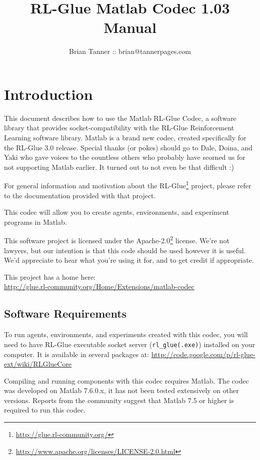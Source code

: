 \documentclass[11pt]{article}
\title{RL-Glue Matlab Codec 1.03 Manual }
\author{Brian Tanner :: brian@tannerpages.com}
\date{}
\begin{document}
\maketitle
\tableofcontents

\section{Introduction}

This document describes how to use the Matlab RL-Glue Codec, a software library that provides socket-compatibility with the RL-Glue Reinforcement Learning software library.  Matlab is a brand new codec, created specifically for the RL-Glue 3.0 release.  Special thanks (or pokes) should go to Dale, Doina, and Yaki who gave voices to the countless others who probably
have scorned us for not supporting Matlab earlier.  It turned out to not even be that difficult :)

For general information and motivation about the RL-Glue\footnote{\url{http://glue.rl-community.org/}} project, please refer to the documentation provided with that project.

This codec will allow you to create agents, environments, and experiment programs in Matlab.

This software project is licensed under the Apache-2.0\footnote{\url{http://www.apache.org/licenses/LICENSE-2.0.html}} license. We're not lawyers, but our intention is that this code 
should be used however it is useful.  We'd appreciate to hear what you're using it for, and to get credit if appropriate.

This project has a home here:\\
\url{http://glue.rl-community.org/Home/Extensions/matlab-codec}


\subsection{Software Requirements}
To run agents, environments, and experiments created with this codec, you will need to have RL-Glue executable socket server (\texttt{rl\_glue(.exe)}) installed on your computer.  It is available in several packages at:\newline
\url{http://code.google.com/p/rl-glue-ext/wiki/RLGlueCore}

Compiling and running components with this codec requires Matlab.  The codec was developed on Matlab 7.6.0.x, it has not been tested extensively on other versions.  Reports from the community suggest that Matlab 7.5 or higher is required to run this codec.
\end{document}
